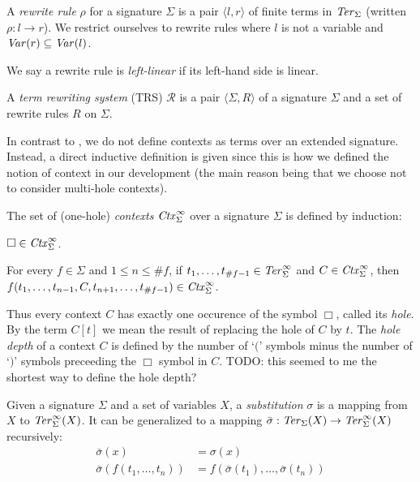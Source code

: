 \begin{definition}%
  A \emph{rewrite rule} $\rho$ for a signature $\Sigma$ is a pair $\langle l,
  r \rangle$ of finite terms in $\mathit{Ter}_\Sigma$ (written $\rho : l \rightarrow
  r$). We restrict ourselves to rewrite rules where $l$ is not a variable and
  $\mathit{Var}(r) \subseteq \mathit{Var}(l)$.
\end{definition}

We say a rewrite rule is \emph{left-linear} if its left-hand side is linear.

\begin{definition}%
A \emph{term rewriting system} (TRS) $\mathcal{R}$ is a pair $\langle \Sigma,
R \rangle$ of a signature $\Sigma$ and a set of rewrite rules $R$ on
$\Sigma$.
\end{definition}

In contrast to \cite{terese-03}, we do not define contexts as terms over an
extended signature. Instead, a direct inductive definition is given since this
is how we defined the notion of context in our \Coq development (the main
reason being that we choose not to consider multi-hole contexts).

\begin{definition}%
The set of (one-hole) \emph{contexts} $\mathit{Ctx}_\Sigma^\infty$ over a signature
$\Sigma$ is defined by induction:
\begin{compactenum}
  \item
    $\Box \in \mathit{Ctx}_\Sigma^\infty$.
  \item
    For every $f \in \Sigma$ and $1 \le n \le \#f$, if $t_1, \ldots, t_{\#f -
      1} \in \mathit{Ter}_\Sigma^\infty$ and $C \in \mathit{Ctx}_\Sigma^\infty$, then $f(t_1, \ldots, t_{n - 1},
    C, t_{n + 1}, \ldots, t_{\#f - 1}) \in \mathit{Ctx}_\Sigma^\infty$.
\end{compactenum}
\end{definition}

Thus every context $C$ has exactly one occurence of the symbol $\Box$, called
its \emph{hole}. By the term $C[t]$ we mean the result of replacing the hole
of $C$ by $t$. The \emph{hole depth} of a context $C$ is defined by the number
of `$($' symbols minus the number of `$)$' symbols preceeding the $\Box$
symbol in $C$.
TODO: this seemed to me the shortest way to define the hole depth?

\begin{definition}%
Given a signature $\Sigma$ and a set of variables $X$, a \emph{substitution}
$\sigma$ is a mapping from $X$ to $\mathit{Ter}_\Sigma^\infty(X)$. It can be
generalized to a mapping $\bar{\sigma} : \mathit{Ter}_\Sigma(X) \rightarrow
\mathit{Ter}_\Sigma^\infty(X)$ recursively:
\begin{align*}
  \bar{\sigma}(x) &= \sigma(x)\\
  \bar{\sigma}(f(t_1, \ldots, t_n)) &= f(\bar{\sigma}(t_1), \ldots,
  \bar{\sigma}(t_n))
\end{align*}
\end{definition}

